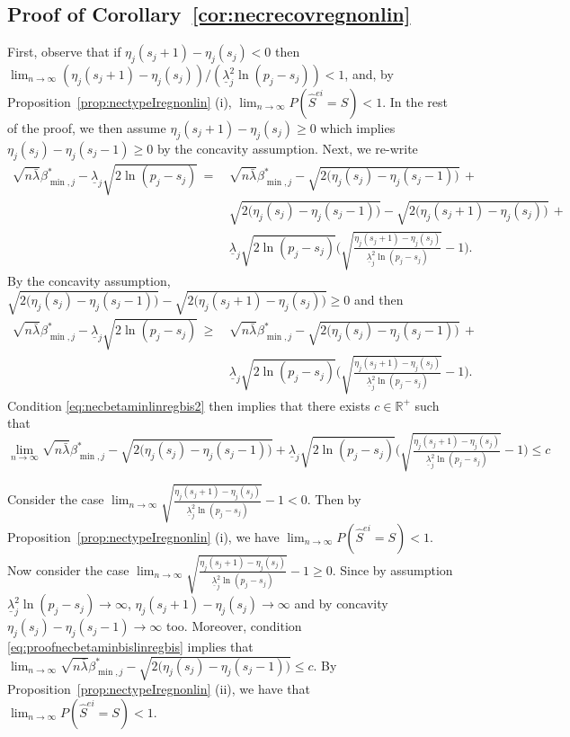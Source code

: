 \documentclass[
  12pt]{article}
\newcommand{\R}{\mathbb{R}}
\begin{document}
\subsection{Proof of Corollary~\ref{cor:necrecovregnonlin}}
 First, observe that if $\eta_j(s_j+1)-\eta_j(s_j)<0$ then $\lim_{n\to\infty}(\eta_j(s_j+1)-\eta_j(s_j))/(\underline{\lambda}_j^2\ln(p_j-s_j)) <1$, and, by Proposition~\ref{prop:nectypeIregnonlin} (i), $\lim_{n\to \infty}P(\hat{S}^{ei} = S)< 1$. In the rest of the proof, we then assume $\eta_j(s_j+1)-\eta_j(s_j)\geq0$ which implies $\eta_j(s_j)-\eta_j(s_j-1)\geq0$ by the concavity assumption.
 Next, we re-write 
 \begin{align*}
     \sqrt{n\bar{\lambda}}\beta_{\min,j}^*-\underline{\lambda}_j\sqrt{2\ln(p_j-s_j)} \,=\,
     & \sqrt{n\bar{\lambda}}\beta_{\min,j}^*-\sqrt{2\big(\eta_j(s_j)-\eta_j(s_j-1)\big)}\,+ \\
     & \sqrt{2\big(\eta_j(s_j)-\eta_j(s_j-1)\big)} - \sqrt{2\big(\eta_j(s_j+1)-\eta_j(s_j)\big)} \,+\\
     & \underline{\lambda}_j\sqrt{2\ln(p_j-s_j)}\Big(\sqrt{\tfrac{\eta_j(s_j+1)-\eta_j(s_j)}{\underline{\lambda}_j^2\ln(p_j-s_j)}}-1\Big).
 \end{align*}
By the concavity assumption, $\sqrt{2\big(\eta_j(s_j)-\eta_j(s_j-1)\big)} - \sqrt{2\big(\eta_j(s_j+1)-\eta_j(s_j)\big)}\geq 0$ and then
 \begin{align*}
     \sqrt{n\bar{\lambda}}\beta_{\min,j}^*-\underline{\lambda}_j\sqrt{2\ln(p_j-s_j)} \,\geq \,
     & \sqrt{n\bar{\lambda}}\beta_{\min,j}^*-\sqrt{2\big(\eta_j(s_j)-\eta_j(s_j-1)\big)}\, +\\
     & \underline{\lambda}_j\sqrt{2\ln(p_j-s_j)}\Big(\sqrt{\tfrac{\eta_j(s_j+1)-\eta_j(s_j)}{\underline{\lambda}_j^2\ln(p_j-s_j)}}-1\Big).
 \end{align*}
Condition \eqref{eq:necbetaminlinregbis2} then implies that there exists $c\in\R^+$ such that
  \begin{equation}\label{eq:proofnecbetaminbislinregbis}
      \lim_{n\to \infty}\sqrt{n\bar{\lambda}}\beta_{\min,j}^*-\sqrt{2\big(\eta_j(s_j)-\eta_j(s_j-1)\big)}+\underline{\lambda}_j\sqrt{2\ln(p_j-s_j)}\Big(\sqrt{\tfrac{\eta_j(s_j+1)-\eta_j(s_j)}{\underline{\lambda}_j^2\ln(p_j-s_j)}}-1\Big)\leq c
  \end{equation}

Consider the case $\lim_{n\to \infty}\sqrt{\tfrac{\eta_j(s_j+1)-\eta_j(s_j)}{\underline{\lambda}_j^2\ln(p_j-s_j)}}-1<0$. Then by Proposition~\ref{prop:nectypeIregnonlin} (i), we have
$\lim_{n\to \infty}P(\hat{S}^{ei} = S)< 1$. Now consider the case $\lim_{n\to \infty}\sqrt{\tfrac{\eta_j(s_j+1)-\eta_j(s_j)}{\underline{\lambda}_j^2\ln(p_j-s_j)}}-1 \geq0$. Since by assumption $\underline{\lambda}^2_j\ln(p_j-s_j)\to\infty$, $\eta_j(s_j+1)-\eta_j(s_j)\to\infty$ and by concavity $\eta_j(s_j)-\eta_j(s_j-1)\to\infty$ too. Moreover, condition \eqref{eq:proofnecbetaminbislinregbis} implies that $\lim_{n\to \infty}\sqrt{n\bar{\lambda}}\beta_{\min,j}^*-\sqrt{2\big(\eta_j(s_j)-\eta_j(s_j-1)\big)} \leq c$. By Proposition~\ref{prop:nectypeIregnonlin} (ii), we have that  $\lim_{n\to \infty}P(\hat{S}^{ei} = S)< 1$.
\end{document}
